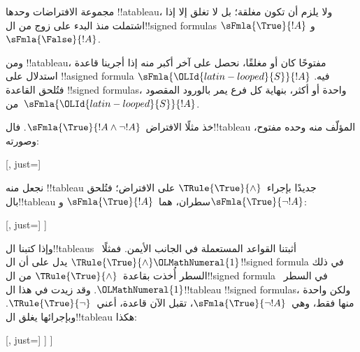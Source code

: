 \documentclass[../../../include/open-logic-section]{subfiles}
\begin{document}
\begin{ex}
  مجموعة الافتراضات وحدها !!a{tableau}، ولا يلزم أن تكون مغلقة؛
  بل لا تغلق إلا إذا اشتملت منذ البدء على زوج من ال!!{signed formula}s
  $\sFmla{\True}{!A}$ و$\sFmla{\False}{!A}$.

  ومن !!a{tableau}، مفتوحًا كان أو مغلقًا، نحصل على آخر أكبر منه
  إذا أجرينا قاعدة استدلال على !!a{signed formula}
  $\sFmla{\OLId{latin-looped}{S}}{!A}$ فيه. فتُلحق القاعدة !!{signed formula}s، واحدة
  أو أكثر، بنهاية كل فرع يمر بالورود المقصود من~$\sFmla{\OLId{latin-looped}{S}}{!A}$.


  خذ مثلًا الافتراض~$\sFmla{\True}{!A \land \lnot !A}$.
  فال!!{tableau} المؤلّف منه وحده مفتوح، وصورته:
  \begin{center}
    \begin{tableau}{}
      [, just=\TAss]
    \end{tableau}{}
  \end{center}
  نجعل منه !!{tableau} جديدًا بإجراء~$\TRule{\True}{\land}$
  على الافتراض؛ فتُلحق بال!!{tableau} سطران،
  هما~$\sFmla{\True}{!A}$ و$\sFmla{\True}{\lnot !A}$:
  \begin{center}
    \begin{tableau}{}
      [, just=\TAss
        [\sFmla{\True}{\formula{A}}, just={\TRule{\True}{\land}[1]},
          [\sFmla{\True}{\lnot \formula{A}}, just={\TRule{\True}{\land}[1]}
          ]
        ]
      ]
    \end{tableau}{}
  \end{center}
  وإذا كتبنا ال!!{tableau}s أثبتنا القواعد المستعملة في الجانب الأيمن.
  فمثلًا~$\TRule{\True}{\land} \OLMathNumeral{1}$ يدل على أن ال!!{signed formula}
  في ذلك السطر أُخذت بقاعدة~$\TRule{\True}{\land}$ من
  ال!!{signed formula} في السطر~$\OLMathNumeral{1}$.
  وقد زيدت في هذا ال!!{tableau} !!{signed formula}s، ولكن واحدة
  منها فقط، وهي~$\sFmla{\True}{\lnot !A}$، تقبل الآن قاعدة،
  أعني~$\TRule{\True}{\lnot}$. وبإجرائها يغلق ال!!{tableau} هكذا:
  \begin{center}
    \begin{tableau}{}
      [, just=\TAss
        [\sFmla{\True}{\formula{A}}, just={\TRule{\True}{\land}[1]}
          [\sFmla{\True}{\lnot \formula{A}}, just={\TRule{\True}{\land}[1]}
            [\sFmla{\False}{\formula{A}}, just={\TRule{\True}{\lnot}[3]}, close]
          ]
        ]
      ]
    \end{tableau}{}
  \end{center}
\end{ex}
\end{document}
